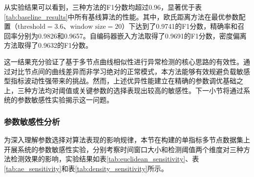 从实验结果可以看到，三种方法的F1分数均超过0.96，显著优于表\ref{tab:baseline_results}中所有基线算法的性能。其中，欧氏距离方法在最优参数配置（$\text{threshold}=3.6$、$\text{window size}=20$）下达到了0.9741的F1分数，精确率和召回率分别为0.9826和0.9657。自编码器嵌入方法取得了0.9691的F1分数，密度偏离方法取得了0.9632的F1分数。

这一结果充分验证了基于多节点曲线相似性进行异常检测的核心思路的有效性。通过对比节点间的曲线差异而非学习绝对的正常模式，本方法能够有效规避负载敏感型指标波动性强带来的挑战。然而，上述优异性能建立在精确的参数调优基础之上，三种方法均对阈值或关键参数的选择表现出较高的敏感性。下一小节将通过系统的参数敏感性实验揭示这一问题。

\subsubsection{参数敏感性分析}

为深入理解参数选择对算法表现的影响规律，本节在构建的单指标多节点数据集上开展系统的参数敏感性实验，分别考察时间窗口大小和检测阈值两个维度对三种方法检测效果的影响，实验结果如表\ref{tab:euclidean_sensitivity}、表\ref{tab:ae_sensitivity}和表\ref{tab:density_sensitivity}所示。

\begin{table}[htbp]
    \centering
    \label{tab:euclidean_sensitivity}
\end{table}

